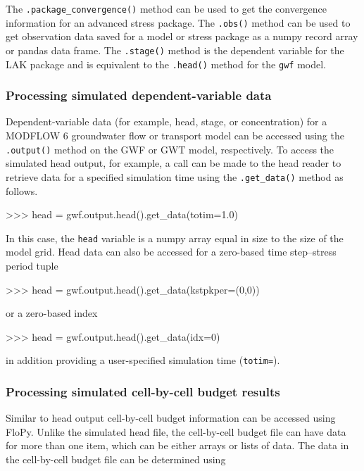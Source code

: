 \documentclass[11pt, oneside]{article}  	%
\begin{document}
\noindent The \texttt{.package\_convergence()} method can be used to get the convergence information for an advanced stress package. The \texttt{.obs()} method can be used to get observation data saved for a model or stress package as a numpy record array or pandas data frame. The \texttt{.stage()} method is the dependent variable for the LAK package and is equivalent to the \texttt{.head()} method for the \texttt{gwf} model. 

\subsubsection{Processing simulated dependent-variable data}

Dependent-variable data (for example, head, stage, or concentration) for a MODFLOW 6 groundwater flow or transport model can be accessed using the \texttt{.output()} method on the GWF or GWT model, respectively. To access the simulated head output, for example, a call can be made to the head reader to retrieve data for a specified simulation time using the \texttt{.get\_data()} method as follows.

\begin{python}
>>> head = gwf.output.head().get_data(totim=1.0)
\end{python}

\noindent In this case, the \texttt{head} variable is a numpy array equal in size to the size of the model grid. Head data can also be accessed for a zero-based time step--stress period tuple 

\begin{python}
>>> head = gwf.output.head().get_data(kstpkper=(0,0))
\end{python}

\noindent or a zero-based index

\begin{python}
>>> head = gwf.output.head().get_data(idx=0)
\end{python}

\noindent in addition providing a user-specified simulation time (\texttt{totim=}). 

\subsubsection{Processing simulated cell-by-cell budget results}

Similar to head output cell-by-cell budget information can be accessed using FloPy. Unlike the simulated head file, the cell-by-cell budget file can have data for more than one item, which can be either arrays or lists of data. The data in the cell-by-cell budget file can be determined using
\end{document}
